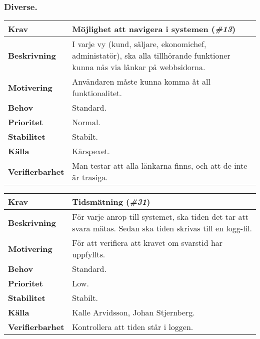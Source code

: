 \documentclass[a4paper, twoside, 11pt, titlepage]{article}
\begin{document}
		\subsubsection{Diverse.}


		\begin{tabular} { p{2.6cm} p{12.5cm} }
			\hline
			\sffamily\textbf{Krav} & Möjlighet att navigera i systemen (\emph{\#13})  \\
			\hline
			\sffamily\textbf{Beskrivning} & I varje vy (kund, säljare, ekonomichef, administatör), ska alla tillhörande funktioner kunna nås via länkar på webbsidorna.  \\
			\hline
			\sffamily\textbf{Motivering} & Användaren måste kunna komma åt all funktionalitet.  \\
			\hline
			\sffamily\textbf{Behov} & Standard.  \\
			\hline
			\sffamily\textbf{Prioritet} & Normal.  \\
			\hline
			\sffamily\textbf{Stabilitet} & Stabilt.  \\
			\hline
			\sffamily\textbf{Källa} & Kårspexet.  \\
			\hline
			\sffamily\textbf{Verifierbarhet} & Man testar att alla länkarna finns, och att de inte är trasiga.  \\
			\hline
		\end{tabular}
		\vspace{6mm}

		\begin{tabular} { p{2.6cm} p{12.5cm} }
			\hline
			\sffamily\textbf{Krav} & Tidsmätning (\emph{\#31})  \\
			\hline
			\sffamily\textbf{Beskrivning} & För varje anrop till systemet, ska tiden det tar att svara mätas. Sedan ska tiden skrivas till en logg-fil.  \\
			\hline
			\sffamily\textbf{Motivering} & För att verifiera att kravet om svarstid har uppfyllts.  \\
			\hline
			\sffamily\textbf{Behov} & Standard.  \\
			\hline
			\sffamily\textbf{Prioritet} & Low.  \\
			\hline
			\sffamily\textbf{Stabilitet} & Stabilt.  \\
			\hline
			\sffamily\textbf{Källa} & Kalle Arvidsson, Johan Stjernberg.  \\
			\hline
			\sffamily\textbf{Verifierbarhet} & Kontrollera att tiden står i loggen.  \\
			\hline
		\end{tabular}
\end{document}
